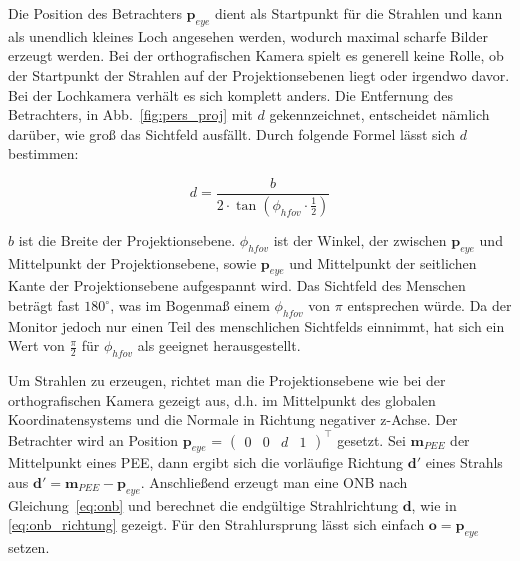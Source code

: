 Die Position des Betrachters \( \boldsymbol{p}_{eye} \) dient als Startpunkt für die Strahlen und kann als unendlich kleines Loch angesehen werden, wodurch maximal scharfe Bilder erzeugt werden. Bei der orthografischen Kamera spielt es generell keine Rolle, ob der Startpunkt der Strahlen auf der Projektionsebenen liegt oder irgendwo davor. Bei der Lochkamera verhält es sich komplett anders. Die Entfernung des Betrachters, in Abb.~\ref{fig:pers_proj} mit \( d \) gekennzeichnet, entscheidet nämlich darüber, wie groß das Sichtfeld ausfällt. Durch folgende Formel lässt sich \( d \) bestimmen:

\begin{equation*}   
     d = \frac{b}{2 \cdot \tan{(\phi_{hfov} \cdot \frac{1}{2})}}
\end{equation*}

\( b \) ist die Breite der Projektionsebene.
\( \phi_{hfov} \) ist der Winkel, der zwischen \( \boldsymbol{p}_{eye} \) und Mittelpunkt der Projektionsebene, sowie \( \boldsymbol{p}_{eye} \) und Mittelpunkt der seitlichen Kante der Projektionsebene aufgespannt wird. Das Sichtfeld des Menschen beträgt fast \( 180^\circ \), was im Bogenmaß einem \( \phi_{hfov} \) von \( \pi \) entsprechen würde. Da der Monitor jedoch nur einen Teil des menschlichen Sichtfelds einnimmt, hat sich ein Wert von \( \frac{\pi}{2} \) für \( \phi_{hfov} \) als geeignet herausgestellt.

Um Strahlen zu erzeugen, richtet man die Projektionsebene wie bei der orthografischen Kamera gezeigt aus, d.h. im Mittelpunkt des globalen Koordinatensystems und die Normale in Richtung negativer z-Achse. Der Betrachter  wird an Position \( \boldsymbol{p}_{eye} \) = \( \begin{pmatrix} 0 & 0 & d & 1 \end{pmatrix}^\intercal \) gesetzt. Sei \( \boldsymbol{m}_{PEE} \) der Mittelpunkt eines PEE, dann ergibt sich die vorläufige Richtung \( \boldsymbol{d'} \) eines Strahls aus \( \boldsymbol{d'} = \boldsymbol{m}_{PEE} - \boldsymbol{p}_{eye} \). Anschließend erzeugt man eine ONB nach Gleichung~\ref{eq:onb} und berechnet die endgültige Strahlrichtung \( \boldsymbol{d} \), wie in \ref{eq:onb_richtung} gezeigt. Für den Strahlursprung lässt sich einfach \( \boldsymbol{o} = \boldsymbol{p}_{eye}\) setzen.


